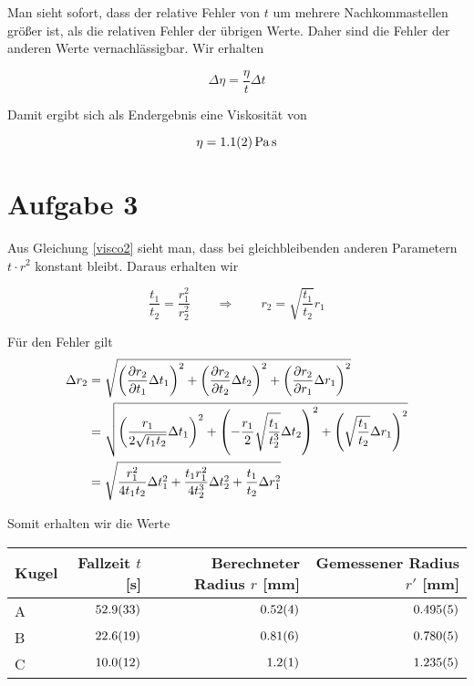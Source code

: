 \documentclass[a4paper,german,12pt,smallheadings]{scrartcl}
\begin{document}
Man sieht sofort, dass der relative Fehler von $t$ um mehrere Nachkommastellen
größer ist, als die relativen Fehler der übrigen Werte. Daher sind die Fehler
der anderen Werte vernachlässigbar. Wir erhalten

\begin{equation}
  \Delta \eta = \frac{\eta}{t} \Delta t
\end{equation}

Damit ergibt sich als Endergebnis eine Viskosität von

\begin{equation*}
  \eta = \SI{1.1+-0.2}{\pascal \second}
\end{equation*}


\section*{Aufgabe 3}

Aus Gleichung \ref{visco2} sieht man, dass bei gleichbleibenden anderen
Parametern $t \cdot r^2$ konstant bleibt. Daraus erhalten wir

\begin{equation}
  \frac{t_1}{t_2} = \frac{r_1^2}{r_2^2} \qquad \Rightarrow \qquad r_2 = \sqrt{\frac{t_1}{t_2}} r_1
\end{equation}

Für den Fehler gilt
\begin{align*}
  \Delta r_2 &= \sqrt{
    \del{\frac{\partial r_2}{\partial t_1} \Delta t_1}^2 +
    \del{\frac{\partial r_2}{\partial t_2} \Delta t_2}^2 +
    \del{\frac{\partial r_2}{\partial r_1} \Delta r_1}^2
  } \\
  &= \sqrt{
    \del{ \frac{r_1}{2 \sqrt{t_1 t_2}} \Delta t_1 }^2 +
    \del{ -\frac{r_1}{2} \sqrt{ \frac{t_1}{t_2^3}} \Delta t_2 }^2 +
    \del{ \sqrt{ \frac{t_1}{t_2}} \Delta r_1 }^2
  } \\
  &= \sqrt{
    \frac{r_1^2}{4 t_1 t_2} \Delta t_1^2 + \frac{t_1 r_1^2}{4 t_2^3} \Delta t_2^2 + \frac{t_1}{t_2} \Delta r_1^2
  }
\end{align*}

Somit erhalten wir die Werte

\vspace{0.5cm}
\begin{tabular}{l|r|r|r}
  Kugel & Fallzeit $t$ [s] & Berechneter Radius $r$ [mm] & Gemessener Radius $r'$ [mm] \\
  \hline
  A & $\num{52.9+-3.3}$ & $\num{0.52+-0.04}$ & $\num{0.495+-0.005}$ \\
  B & $\num{22.6+-1.9}$ & $\num{0.81+-0.06}$ & $\num{0.780+-0.005}$ \\
  C & $\num{10.0+-1.2}$ & $\num{1.2+-0.1}$ & $\num{1.235+-0.005}$ \\
\end{tabular}
\vspace{0.5cm}
\end{document}
